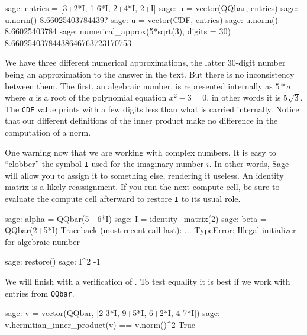 %
\begin{sageexample}
sage: entries = [3+2*I, 1-6*I, 2+4*I, 2+I]
sage: u = vector(QQbar, entries)
sage: u.norm()
8.66025403784439?
sage: u = vector(CDF, entries)
sage: u.norm()
8.66025403784
sage: numerical_approx(5*sqrt(3), digits = 30)
8.66025403784438646763723170753
\end{sageexample}
%
We have three different numerical approximations, the latter 30-digit number being an approximation to the answer in the text.  But there is no inconsistency between them.  The first, an algebraic number, is represented internally as $5*a$ where $a$ is a root of the polynomial equation $x^2-3=0$, in other words it is $5\sqrt{3}$.  The \verb?CDF? value prints with a few digits less than what is carried internally.  Notice that our different definitions of the inner product make no difference in the computation of a norm.\par
%
One warning now that we are working with complex numbers.  It is easy to ``clobber'' the symbol \verb?I? used for the imaginary number $i$.  In other words, Sage will allow you to assign it to something else, rendering it useless.  An identity matrix is a likely reassignment.  If you run the next compute cell, be sure to evaluate the compute cell afterward to restore \verb?I? to its usual role.
%
\begin{sageexample}
sage: alpha = QQbar(5 - 6*I)
sage: I = identity_matrix(2)
sage: beta = QQbar(2+5*I)
Traceback (most recent call last):
...
TypeError: Illegal initializer for algebraic number
\end{sageexample}
%
\begin{sageexample}
sage: restore()
sage: I^2
-1
\end{sageexample}
%
We will finish with a verification of .  To test equality it is best if we work with entries from \verb?QQbar?.
%
\begin{sageexample}
sage: v = vector(QQbar, [2-3*I, 9+5*I, 6+2*I, 4-7*I])
sage: v.hermitian_inner_product(v) == v.norm()^2
True
\end{sageexample}
%